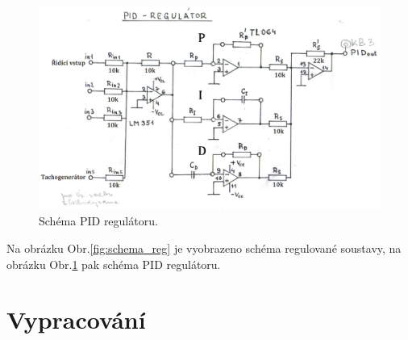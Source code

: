 \begin{figure}[!hbt] 
	\centering
	\includegraphics[]{img/schema_PID_regulatoru.png} 
	\caption{Schéma PID regulátoru.} 
	\label{fig:schema_PID}
\end{figure}		
		
Na obrázku Obr.\ref{fig:schema_reg} je vyobrazeno schéma regulované soustavy, na obrázku Obr.\ref{fig:schema_PID} pak schéma PID regulátoru.


			
\section{Vypracování}
